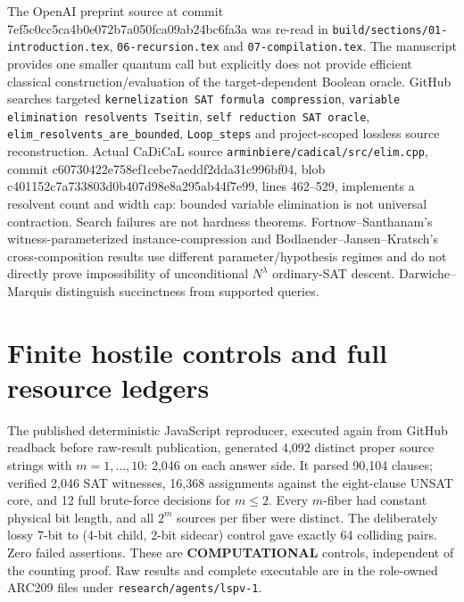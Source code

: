 \documentclass{article}
\begin{document}
The OpenAI preprint source at commit
7ef5c0cc5ca4b0e072b7a050fca09ab24bc6fa3a
was re-read in
\texttt{build/sections/01-introduction.tex},
\texttt{06-recursion.tex} and \texttt{07-compilation.tex}.
The manuscript provides one smaller quantum call but explicitly
does not provide efficient classical construction/evaluation
of the target-dependent Boolean oracle.
GitHub searches targeted
\texttt{kernelization SAT formula compression},
\texttt{variable elimination resolvents Tseitin},
\texttt{self reduction SAT oracle},
\texttt{elim\_resolvents\_are\_bounded}, \texttt{Loop\_steps}
and project-scoped lossless source reconstruction.
Actual CaDiCaL source \texttt{arminbiere/cadical/src/elim.cpp},
commit c60730422e758ef1cebe7aeddf2dda31c996bf04,
blob c401152c7a733803d0b407d98e8a295ab44f7e99,
lines 462--529, implements a resolvent count and width cap:
bounded variable elimination is not universal contraction.
Search failures are not hardness theorems.
Fortnow--Santhanam's witness-parameterized instance-compression
and Bodlaender--Jansen--Kratsch's cross-composition results use
different parameter/hypothesis regimes and do not directly prove
impossibility of unconditional $N^\lambda$ ordinary-SAT descent.
Darwiche--Marquis distinguish succinctness from supported queries.


\section{Finite hostile controls and full resource ledgers}
The published deterministic JavaScript reproducer, executed again
from GitHub readback before raw-result publication, generated
4,092 distinct proper source strings with $m=1,\ldots,10$:
2,046 on each answer side. It parsed 90,104 clauses;
verified 2,046 SAT witnesses, 16,368 assignments against the
eight-clause UNSAT core, and 12 full brute-force decisions for
$m\le 2$. Every $m$-fiber had constant physical bit length, and
all $2^m$ sources per fiber were distinct. The deliberately
lossy 7-bit to (4-bit child, 2-bit sidecar) control gave
exactly 64 colliding pairs. Zero failed assertions. These are
\textbf{COMPUTATIONAL} controls, independent of the counting proof.
Raw results and complete executable are in the role-owned ARC209
files under \texttt{research/agents/lspv-1}.
\end{document}
